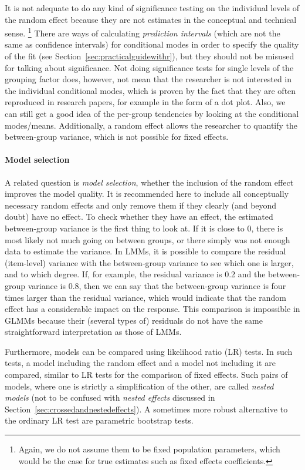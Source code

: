 It is not adequate to do any kind of significance testing on the individual levels of the random effect because they are not estimates in the conceptual and technical sense.%
\footnote{Again, we do not assume them to be fixed population parameters, which would be the case for true estimates such as fixed effects coefficients.}
There are ways of calculating \textit{prediction intervals} (which are not the same as confidence intervals) for conditional modes in order to specify the quality of the fit (see Section~\ref{sec:practicalguidewithr}), but they should not be misused for talking about significance.
Not doing significance tests for single levels of the grouping factor does, however, not mean that the researcher is not interested in the individual conditional modes, which is proven by the fact that they are often reproduced in research papers, for example in the form of a dot plot.
Also, we can still get a good idea of the per-group tendencies by looking at the conditional modes\slash means.
Additionally, a random effect allows the researcher to quantify the between-group variance, which is not possible for fixed effects.

\paragraph{Model selection}

A related question is \textit{model selection}, \ie whether the inclusion of the random effect improves the model quality.
It is recommended here to include all conceptually necessary random effects and only remove them if they clearly (and beyond doubt) have no effect.
To check whether they have an effect, the estimated between-group variance is the first thing to look at.
If it is close to $0$, there is most likely not much going on between groups, or there simply was not enough data to estimate the variance.
In LMMs, it is possible to compare the residual (item-level) variance with the between-group variance to see which one is larger, and to which degree.
If, for example, the residual variance is 0.2 and the between-group variance is 0.8, then we can say that the between-group variance is four times larger than the residual variance, which would indicate that the random effect has a considerable impact on the response.
This comparison is impossible in GLMMs because their (several types of) residuals do not have the same straightforward interpretation as those of LMMs.

Furthermore, models can be compared using likelihood ratio (LR) tests.
In such tests, a model including the random effect and a model not including it are compared, similar to LR tests for the comparison of fixed effects.
Such pairs of models, where one is strictly a simplification of the other, are called \textit{nested models} (not to be confused with \textit{nested effects} discussed in Section~\ref{sec:crossedandnestedeffects}).
A sometimes more robust alternative to the ordinary LR test are parametric bootstrap tests. 

